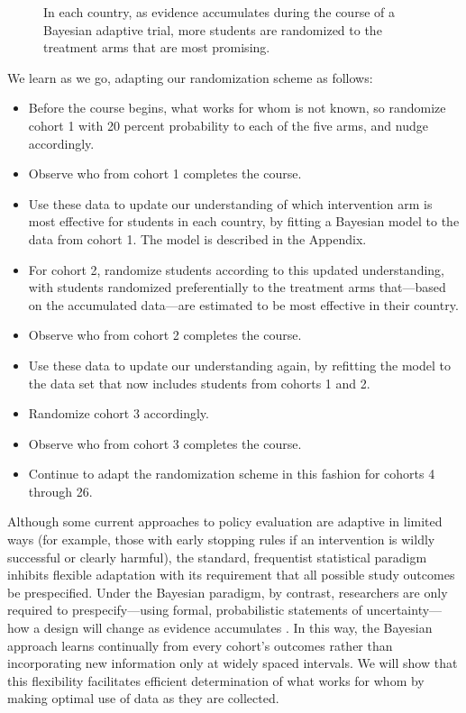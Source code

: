\documentclass{acm_proc_article-sp}
\begin{document}
\begin{figure}
\centering
{}
\caption{In each country, as evidence accumulates during the course of a Bayesian adaptive trial, more students are randomized to the treatment arms that are most promising.}
\label{fig:timeline2}
\end{figure}

We learn as we go, adapting our randomization scheme as follows:
\begin{itemize}
    \item Before the course begins, what works for whom is not known, so randomize cohort 1 with 20 percent probability to each of the five arms, and nudge accordingly.
    \item Observe who from cohort 1 completes the course.
    \item Use these data to update our understanding of which intervention arm is most effective for students in each country, by fitting a Bayesian model to the data from cohort 1. The model is described in the Appendix.
    \item For cohort 2, randomize students according to this updated understanding, with students randomized preferentially to the treatment arms that—based on the accumulated data—are estimated to be most effective in their country.
    \item Observe who from cohort 2 completes the course.
    \item Use these data to update our understanding again, by refitting the model to the data set that now includes students from cohorts 1 and 2.
    \item Randomize cohort 3 accordingly.
    \item Observe who from cohort 3 completes the course.
    \item Continue to adapt the randomization scheme in this fashion for cohorts 4 through 26.
\end{itemize}

Although some current approaches to policy evaluation are adaptive in limited ways (for example, those with early stopping rules if an intervention is wildly successful or clearly harmful), the standard, frequentist statistical paradigm inhibits flexible adaptation with its requirement that all possible study outcomes be prespecified. Under the Bayesian paradigm, by contrast, researchers are only required to prespecify—using formal, probabilistic statements of uncertainty—how a design will change as evidence accumulates \cite{berry2006bayesian, george1994stopping}. In this way, the Bayesian approach learns continually from every cohort's outcomes rather than incorporating new information only at widely spaced intervals. We will show that this flexibility facilitates efficient determination of what works for whom by making optimal use of data as they are collected.
\end{document}
